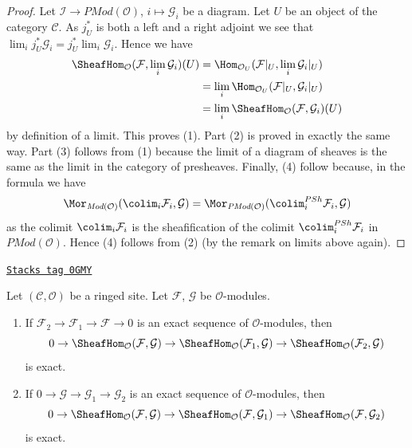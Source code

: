 \begin{proof}
Let $\mathcal{I} \to \textit{PMod}(\mathcal{O})$, $i \mapsto \mathcal{G}_i$
be a diagram. Let $U$ be an object of the category $\mathcal{C}$.
As $j_U^*$ is both a left and a right adjoint we see that
$\lim_i j_U^*\mathcal{G}_i = j_U^* \lim_i \mathcal{G}_i$.
Hence we have
\begin{align*}
\SheafHom_\mathcal{O}(\mathcal{F}, \lim_i \mathcal{G}_i)(U)
& =
\Hom_{\mathcal{O}_U}(\mathcal{F}|_U, \lim_i \mathcal{G}_i|_U) \\
& =
\lim_i \Hom_{\mathcal{O}_U}(\mathcal{F}|_U, \mathcal{G}_i|_U) \\
& = \lim_i \SheafHom_\mathcal{O}(\mathcal{F}, \mathcal{G}_i)(U)
\end{align*}
by definition of a limit. This proves (1). Part (2) is proved in exactly the
same way. Part (3) follows from (1) because the limit of a diagram of sheaves
is the same as the limit in the category of presheaves.
Finally, (4) follow because, in the formula we have
$$
\Mor_{\textit{Mod}(\mathcal{O})}(
\colim_i \mathcal{F}_i, \mathcal{G})
=
\Mor_{\textit{PMod}(\mathcal{O})}(
\colim^{PSh}_i \mathcal{F}_i, \mathcal{G})
$$
as the colimit $\colim_i \mathcal{F}_i$ is the sheafification of
the colimit $\colim^{PSh}_i \mathcal{F}_i$ in
$\textit{PMod}(\mathcal{O})$. Hence (4) follows from (2)
(by the remark on limits above again).
\end{proof}

\begin{lemma}
\label{sites-modules-lemma-internal-hom-exact}
\href{https://stacks.math.columbia.edu/tag/0GMY}{\texttt{Stacks tag 0GMY}}

Let $(\mathcal{C}, \mathcal{O})$ be a ringed site.
Let $\mathcal{F}$, $\mathcal{G}$ be $\mathcal{O}$-modules.
\begin{enumerate}
\item If $\mathcal{F}_2 \to \mathcal{F}_1 \to \mathcal{F} \to 0$
is an exact sequence of $\mathcal{O}$-modules, then
$$
0 \to
\SheafHom_\mathcal{O}(\mathcal{F}, \mathcal{G}) \to
\SheafHom_\mathcal{O}(\mathcal{F}_1, \mathcal{G}) \to
\SheafHom_\mathcal{O}(\mathcal{F}_2, \mathcal{G})
$$
is exact.
\item If $0 \to \mathcal{G} \to \mathcal{G}_1 \to \mathcal{G}_2$
is an exact sequence of $\mathcal{O}$-modules, then
$$
0 \to
\SheafHom_\mathcal{O}(\mathcal{F}, \mathcal{G}) \to
\SheafHom_\mathcal{O}(\mathcal{F}, \mathcal{G}_1) \to
\SheafHom_\mathcal{O}(\mathcal{F}, \mathcal{G}_2)
$$
is exact.
\end{enumerate}
\end{lemma}

